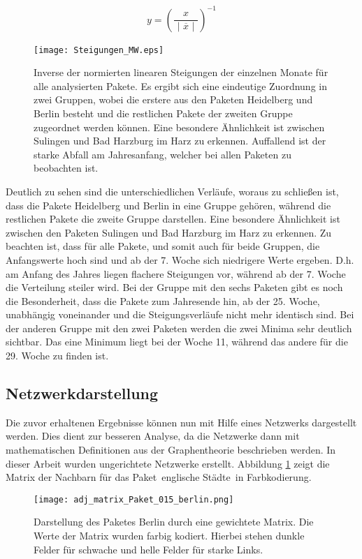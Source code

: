 \documentclass[fontsize=11pt, twoside, a4paper]{scrartcl}
\begin{document}
\begin{align}
	y = \left(\dfrac{\,\,\,\,x\,\,\,\,}{\,\,\vert\,\,\overline{x}\,\,\vert\,\,}\right)^{-1}
\end{align}
\label{sec:St4}
\begin{figure}[H]
	\centering
	\texttt{[image: Steigungen\_MW.eps]}
	\caption{Inverse der normierten linearen Steigungen der einzelnen Monate für alle analysierten Pakete. Es ergibt sich eine eindeutige Zuordnung in zwei Gruppen, wobei die erstere aus den Paketen Heidelberg und Berlin besteht und die restlichen Pakete der zweiten Gruppe zugeordnet werden können. Eine besondere Ähnlichkeit ist zwischen Sulingen und Bad Harzburg im Harz zu erkennen. Auffallend ist der starke Abfall am Jahresanfang, welcher bei allen Paketen zu beobachten ist.}
\end{figure}
Deutlich zu sehen sind die unterschiedlichen Verläufe, woraus zu schließen ist, dass die Pakete Heidelberg und Berlin in eine Gruppe gehören, während die restlichen Pakete die zweite Gruppe darstellen. Eine besondere Ähnlichkeit ist zwischen den Paketen Sulingen und Bad Harzburg im Harz zu erkennen. Zu beachten ist, dass für alle Pakete, und somit auch für beide Gruppen, die Anfangswerte hoch sind und ab der 7. Woche sich niedrigere Werte ergeben. D.h. am Anfang des Jahres liegen flachere Steigungen vor, während ab der 7. Woche die Verteilung steiler wird. Bei der Gruppe mit den sechs Paketen gibt es noch die Besonderheit, dass die Pakete zum Jahresende hin, ab der 25. Woche, unabhängig voneinander und die Steigungsverläufe nicht mehr identisch sind. Bei der anderen Gruppe mit den zwei Paketen werden die zwei Minima sehr deutlich sichtbar. Das eine Minimum liegt bei der Woche 11, während das andere für die 29. Woche zu finden ist. 

\subsection{Netzwerkdarstellung}
Die zuvor erhaltenen Ergebnisse können nun mit Hilfe eines Netzwerks dargestellt werden. Dies dient zur besseren Analyse, da die Netzwerke dann mit mathematischen Definitionen aus der Graphentheorie beschrieben werden. In dieser Arbeit wurden ungerichtete Netzwerke erstellt. Abbildung \ref{Matrix} zeigt die Matrix der Nachbarn für das Paket \,\glqq englische Städte\grqq\, in Farbkodierung.
\begin{figure}[H]
	\centering
		\texttt{[image: adj\_matrix\_Paket\_015\_berlin.png]}
		
	\caption{Darstellung des Paketes Berlin durch eine gewichtete Matrix. Die Werte der Matrix wurden farbig kodiert. Hierbei stehen dunkle Felder für schwache und helle Felder für starke Links.}
	\label{Matrix}
\end{figure}
\end{document}

